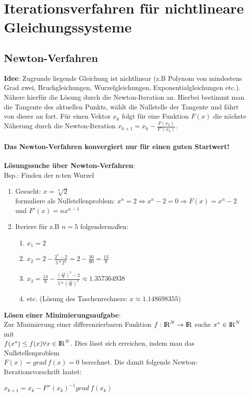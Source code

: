 \documentclass[10pt,a4paper]{article}
\def\realnumbers{{\rm I\!R}}
\begin{document}
	\section{Iterationsverfahren für nichtlineare Gleichungssysteme}
	\subsection{Newton-Verfahren}
	\textbf{Idee}: Zugrunde liegende Gleichung ist nichtlinear (z.B Polynom von mindestens Grad zwei, Bruchgleichungen, Wurzelgleichungen, Exponentialgleichungen etc.). Nähere hierfür die Lösung durch die Newton-Iteration an. Hierbei bestimmt man die Tangente des aktuellen Punkts, wählt die Nullstelle der Tangente und fährt von dieser an fort. Für einen Vektor $x_k$ folgt für eine Funktion $F(x)$ die nächste Näherung durch die Newton-Iteration $x_{k + 1} = x_k - \frac{F(x_k)}{F'(x_k)}$.\\\\
	\textbf{Das Newton-Verfahren konvergiert nur für einen guten Startwert!}\\\\
	\textbf{Lösungssuche über Newton-Verfahren}:\\
	Bsp.: Finden der n-ten Wurzel
	\begin{enumerate}
		\item Gesucht: $x = \sqrt[n]{2}$\\formuliere als Nullstellenproblem: $x^n = 2 \Leftrightarrow x^n - 2 = 0 \Rightarrow F(x) = x^n - 2$ und $F'(x) = nx^{n - 1}$
		\item Iteriere für z.B $n = 5$ folgendermaßen:
		\begin{enumerate}
			\item $x_1 = 2$
			\item $x_2 = 2 - \frac{2^5 - 2}{5 * 2^4} = 2 - \frac{30}{80} = \frac{13}{8}$
			\item $x_3 = \frac{13}{8} - \frac{(\frac{13}{8})^5 - 2}{5 * (\frac{13}{8})^4} \approx 1.357364938$
			\item etc. (Lösung des Taschenrechners: $x \approx 1.148698355$)
		\end{enumerate}
	\end{enumerate}
	\textbf{Lösen einer Minimierungsaufgabe}:\\
	Zur Minimierung einer differenzierbaren Funktion $f: \realnumbers^N \rightarrow \realnumbers$ suche $x^* \in \realnumbers^N$ mit\\$f(x^*) \leq f(x) \forall x \in \realnumbers^N$. Dies lässt sich erreichen, indem man das Nullstellenproblem\\$F(x) = grad\ f(x) = 0$ berechnet. Die damit folgende Newton-Iterationsvorschrift lautet:
	\begin{center}
		$x_{k + 1} = x_k - F''(x_k)^{-1} grad\ f(x_k)$
	\end{center}
\end{document}
